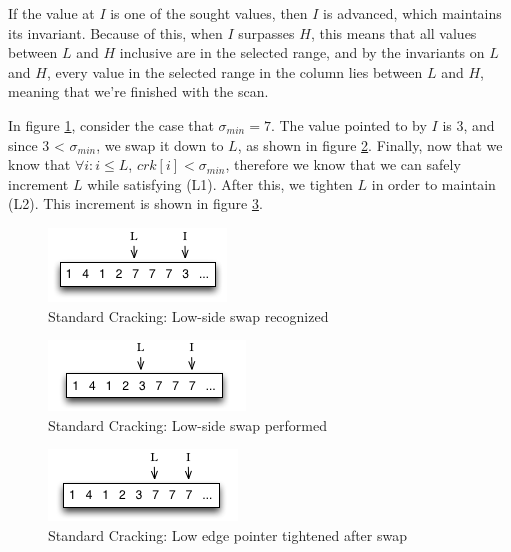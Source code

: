 If the value at $I$ is one of the sought values, then $I$ is advanced, which maintains its invariant. Because of this, when $I$ surpasses $H$, this means that all values between $L$ and $H$ inclusive are in the selected range, and by the invariants on $L$ and $H$, every value in the selected range in the column lies between $L$ and $H$, meaning that we're finished with the scan.

In figure \ref{fig:cracking_scan_low_side_1}, consider the case that $\sigma _{min} = 7$. The value pointed to by $I$ is 3, and since 3 < $\sigma _{min}$, we swap it down to $L$, as shown in figure \ref{fig:cracking_scan_low_side_2}. Finally, now that we know that $\forall i: i \leq L$, $crk[i] < \sigma _{min}$, therefore we know that we can safely increment $L$ while satisfying (L1). After this, we tighten $L$ in order to maintain (L2). This increment is shown in figure \ref{fig:cracking_scan_low_side_3}.

\begin{figure}[H]
  \centering
  \includegraphics[]{images/d2_background_cracking_scan_1a}
  \caption{Standard Cracking: Low-side swap recognized}
  \label{fig:cracking_scan_low_side_1}
\end{figure}

\begin{figure}[H]
  \centering
  \includegraphics[]{images/d2_background_cracking_scan_1b}
  \caption{Standard Cracking: Low-side swap performed}
  \label{fig:cracking_scan_low_side_2}
\end{figure}

\begin{figure}[H]
  \centering
  \includegraphics[]{images/d2_background_cracking_scan_1c}
  \caption{Standard Cracking: Low edge pointer tightened after swap}
  \label{fig:cracking_scan_low_side_3}
\end{figure}

